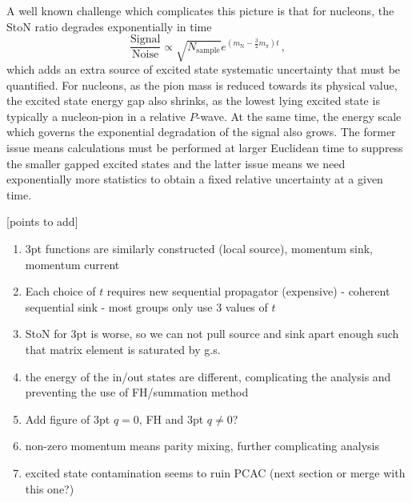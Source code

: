 A well known challenge which complicates this picture is that for nucleons, the StoN ratio degrades exponentially in time~\cite{Lepage:1989hd}
\begin{equation}
\frac{\mathrm{Signal}}{\mathrm{Noise}} \propto \sqrt{N_{\mathrm{sample}}} e^{(m_{\mathrm{N}} - \frac{3}{2}m_\pi)t}\, ,
\end{equation}
 which adds an extra source of excited state systematic uncertainty that must be quantified.
For nucleons, as the pion mass is reduced towards its physical value, the excited state energy gap also shrinks, as the lowest lying excited state is typically a nucleon-pion in a relative $P$-wave.  At the same time, the energy scale which governs the exponential degradation of the signal also grows.  The former issue means calculations must be performed at larger Euclidean time to suppress the smaller gapped excited states and the latter issue means we need exponentially more statistics to obtain a fixed relative uncertainty at a given time.

\bigskip\noindent
{\color{red}[points to add]}
\begin{enumerate}
\item 3pt functions are similarly constructed (local source), momentum sink, momentum current

\item Each choice of $t$ requires new sequential propagator (expensive) - coherent sequential sink - most groups only use 3 values of $t$

\item StoN for 3pt is worse, so we can not pull source and sink apart enough such that matrix element is saturated by g.s.

\item the energy of the in/out states are different, complicating the analysis and preventing the use of FH/summation method

\item Add figure of 3pt $q=0$, FH and 3pt $q\neq0$?

\item non-zero momentum means parity mixing, further complicating analysis

\item excited state contamination seems to ruin PCAC (next section or merge with this one?)


\end{enumerate}
